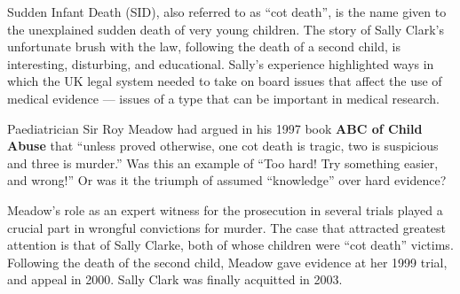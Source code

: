 \documentclass[
  10ptls,
  b5paper]{book}
\begin{document}
Sudden Infant Death (SID), also referred to as ``cot death'',
is the name given to the unexplained sudden death of very
young children. The story of Sally Clark's unfortunate brush
with the law, following the death of a second child, is
interesting, disturbing, and educational. Sally's experience
highlighted ways in which the UK legal system needed to take
on board issues that affect the use of medical evidence ---
issues of a type that can be important in medical research.

Paediatrician Sir Roy Meadow had argued in his 1997 book
\textbf{ABC of Child Abuse} that ``unless proved otherwise,
one cot death is tragic, two is suspicious and three is murder.''
Was this an example of ``Too hard! Try something easier, and wrong!''
Or was it the triumph of assumed ``knowledge'' over hard evidence?

Meadow's role as an expert witness for the prosecution in several
trials played a crucial part in wrongful convictions for murder.
The case that attracted greatest attention is that of Sally Clarke,
both of whose children were ``cot death'' victims. Following the
death of the second child, Meadow gave evidence at her 1999 trial,
and appeal in 2000. Sally Clark was finally acquitted in 2003.
\end{document}
